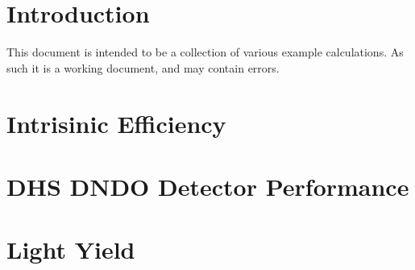 \documentclass{article}
\begin{document}
\printnomenclature
\printindex
\section{Introduction}
This document is intended to be a collection of various example calculations.
As such it is a working document, and may contain errors.

\section{Intrisinic Efficiency}

\section{DHS DNDO Detector Performance}
\section{Light Yield}

\end{document}
